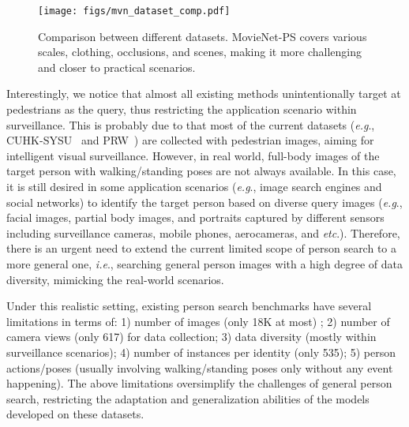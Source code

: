 \documentclass{article}
\def\eg{\emph{e.g}.} \def\Eg{\emph{E.g}.}
\def\ie{\emph{i.e}.} \def\Ie{\emph{I.e}.}
\def\etc{\emph{etc}.} \def\vs{\emph{vs}.}
\begin{document}
\begin{figure}[!t]
\begin{center}
\texttt{[image: figs/mvn\_dataset\_comp.pdf]}
\end{center}
\vspace{-7mm}
\caption{Comparison between different datasets. MovieNet-PS covers various scales, clothing, occlusions, and scenes, making it more challenging and closer to practical scenarios.
}
\vspace{-3mm}
\label{fig:dataset_comp}
\end{figure}

Interestingly, we notice that almost all existing methods unintentionally target at pedestrians as the query, thus restricting the application scenario within surveillance. This is probably due to that most of the current datasets (\eg, CUHK-SYSU~\cite{OIM} and PRW~\cite{PRW}) are collected with pedestrian images, aiming for intelligent visual surveillance. However, in real world, full-body images of the target person with walking/standing poses are not always available. In this case, it is still desired in some application scenarios (\eg, image search engines and social networks) to identify the target person based on diverse query images (\eg, facial images, partial body images, and portraits captured by different sensors including surveillance cameras, mobile phones, aerocameras, and \etc{}). Therefore, there is an urgent need to extend the current limited scope of person search to a more general one, \ie, searching general person images with a high degree of data diversity, mimicking the real-world scenarios.

Under this realistic setting, existing person search benchmarks have several limitations in terms of: 1) number of images (only 18K at most) ; 2) number of camera views (only 617) for data collection; 3) data diversity (mostly within surveillance scenarios); 4) number of instances per identity (only 535);
5) person actions/poses (usually involving walking/standing poses only without any event happening). The above limitations oversimplify the challenges of general person search, restricting the adaptation and generalization abilities of the models developed on these datasets.
\end{document}
